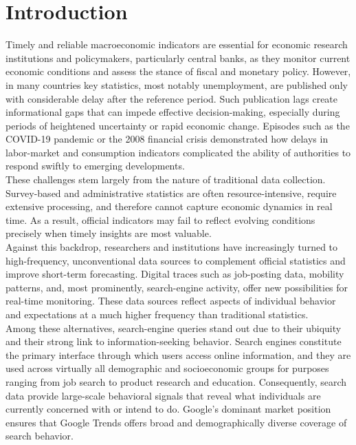 \documentclass[12pt,a4paper]{article}
\begin{document}

\section{Introduction}
Timely and reliable macroeconomic indicators are essential for economic research institutions and policymakers, particularly central banks, as they monitor current economic conditions and assess the stance of fiscal and monetary policy.
However, in many countries key statistics, most notably unemployment, are published only with considerable delay after the reference period.
Such publication lags create informational gaps that can impede effective decision-making, especially during periods of heightened uncertainty or rapid economic change. Episodes such as the COVID-19 pandemic or the 2008 financial crisis demonstrated how delays in labor-market and consumption indicators complicated the ability of authorities to respond swiftly to emerging developments.
\\
These challenges stem largely from the nature of traditional data collection.
Survey-based and administrative statistics are often resource-intensive, require extensive processing, and therefore cannot capture economic dynamics in real time. As a result, official indicators may fail to reflect evolving conditions precisely when timely insights are most valuable.
\\
Against this backdrop, researchers and institutions have increasingly turned to high-frequency, unconventional data sources to complement official statistics and improve short-term forecasting.
Digital traces such as job-posting data, mobility patterns, and, most prominently, search-engine activity, offer new possibilities for real-time monitoring. These data sources reflect aspects of individual behavior and expectations at a much higher frequency than traditional statistics.
\\
Among these alternatives, search-engine queries stand out due to their ubiquity and their strong link to information-seeking behavior.
Search engines constitute the primary interface through which users access online information, and they are used across virtually all demographic and socioeconomic groups for purposes ranging from job search to product research and education.
Consequently, search data provide large-scale behavioral signals that reveal what individuals are currently concerned with or intend to do.
Google’s dominant market position ensures that Google Trends offers broad and demographically diverse coverage of search behavior.\\
\end{document}
